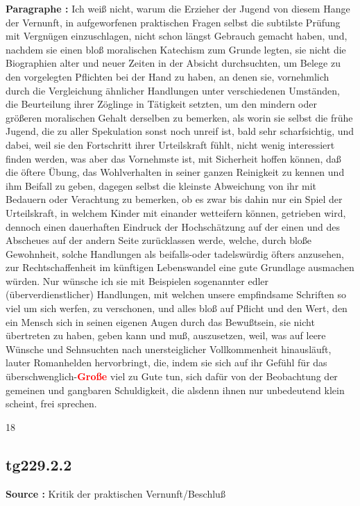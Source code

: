 \documentclass[a4paper,12pt,twoside]{book}
\newcommand{\match}[1]{\textcolor{red}{\textbf{#1}}}
\begin{document}
	\noindent\textbf{Paragraphe : }Ich weiß nicht, warum die Erzieher der Jugend von diesem Hange der Vernunft, in aufgeworfenen praktischen Fragen selbst die subtilste Prüfung mit Vergnügen einzuschlagen, nicht schon längst Gebrauch gemacht haben, und, nachdem sie einen bloß moralischen Katechism zum Grunde legten, sie nicht die Biographien alter und neuer Zeiten in  der Absicht durchsuchten, um Belege zu den vorgelegten Pflichten bei der Hand zu haben, an denen sie, vornehmlich durch die Vergleichung ähnlicher Handlungen unter verschiedenen Umständen, die Beurteilung ihrer Zöglinge in Tätigkeit setzten, um den mindern oder größeren moralischen Gehalt derselben zu bemerken, als worin sie selbst die frühe Jugend, die zu aller Spekulation sonst noch unreif ist, bald sehr scharfsichtig, und dabei, weil sie den Fortschritt ihrer Urteilskraft fühlt, nicht wenig interessiert finden werden, was aber das Vornehmste ist, mit Sicherheit hoffen können, daß die öftere Übung, das Wohlverhalten in seiner ganzen Reinigkeit zu kennen und ihm Beifall zu geben, dagegen selbst die kleinste Abweichung von ihr mit Bedauern oder Verachtung zu bemerken, ob es zwar bis dahin nur ein Spiel der Urteilskraft, in welchem Kinder mit einander wetteifern können, getrieben wird, dennoch einen dauerhaften Eindruck der Hochschätzung auf der einen und des Abscheues auf der andern Seite zurücklassen werde, welche, durch bloße Gewohnheit, solche Handlungen als beifalls-oder tadelswürdig öfters anzusehen, zur Rechtschaffenheit im künftigen Lebenswandel eine gute Grundlage ausmachen würden. Nur wünsche ich sie mit Beispielen sogenannter edler (überverdienstlicher) Handlungen, mit welchen unsere empfindsame Schriften so viel um sich werfen, zu verschonen, und alles bloß auf Pflicht und den Wert, den ein Mensch sich in seinen eigenen Augen durch das Bewußtsein, sie nicht übertreten zu haben, geben kann und muß, auszusetzen, weil, was auf leere Wünsche und Sehnsuchten nach unersteiglicher Vollkommenheit hinausläuft, lauter Romanhelden hervorbringt, die, indem sie sich auf ihr Gefühl für das überschwenglich-\match{Große} viel zu Gute tun, sich dafür von der Beobachtung der gemeinen und gangbaren Schuldigkeit, die alsdenn ihnen nur unbedeutend klein scheint, frei sprechen.
	
	
	18
	
	
	
	\subsection*{tg229.2.2} 
	\textbf{Source : }Kritik der praktischen Vernunft/Beschluß\\  
	
\end{document}
